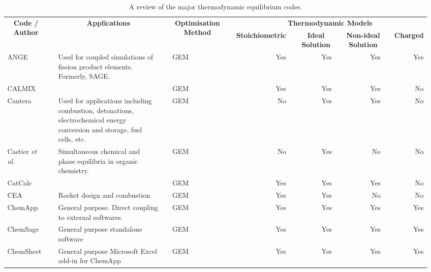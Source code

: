 \begin{landscape}
\pagestyle{empty}
	\begin{longtable}{@{}p{}cp{}clcrcrcrcr@{}}
		\caption{A review of the major thermodynamic equilibrium codes.}\\
		\ra{1.3}\\
		\toprule
		\multicolumn{1}{c}{\multirow{2}{*}{\textbf{Code / Author}}} &\phantom{} & \multicolumn{1}{c}{\multirow{2}{*}{\textbf{Applications}}} & \phantom{} & \multicolumn{1}{c}{\multirow{2}{*}{\textbf{Optimisation Method}}} &\phantom{} & \multicolumn{7}{c}{\textbf{Thermodynamic Models}} \\
		\cmidrule{7-13}
		\multicolumn{1}{c}{} & \phantom{} & \multicolumn{1}{c}{} & \phantom{} & \multicolumn{1}{c}{} & \phantom{} & \multicolumn{1}{c}{\textbf{Stoichiometric}} & \phantom{} & \multicolumn{1}{c}{\textbf{Ideal Solution}} & \phantom{} & \multicolumn{1}{c}{\textbf{Non-ideal Solution}} & \phantom{} & \multicolumn{1}{c}{\textbf{Charged}} \\
		\midrule
		\endhead
		ANGE \cite{Baurens:2014aa} && {Used for coupled simulations of fission product elements. Formerly, SAGE.} && GEM && Yes && Yes && Yes && Yes \\
		CALMIX \cite{GREINER1988529} && {} && GEM && Yes && Yes && Yes && No \\
		Cantera \cite{Goodwin:aa} && {Used for applications including combustion, detonations, electrochemical energy conversion and storage, fuel cells, etc.} && GEM && No && Yes && Yes && No \\
		Castier \textit{et al.} \cite{CASTIER1989237} && {Simultaneous chemical and phase equilibria in organic chemistry.} && GEM && No && Yes && No && No \\
		CatCalc \cite{Shobu09} && {} && GEM && Yes && Yes && Yes && No \\
		CEA \cite{Gordon94} && {Rocket design and combustion} && GEM && Yes && Yes && No && No \\
		ChemApp \cite{Eriksson:2008aa} && {General purpose. Direct coupling to external softwares.} && GEM && Yes && Yes && Yes && Yes\\
		ChemSage \cite{Eriksson90} && {General purpose standalone software} && GEM && Yes && Yes && Yes && Yes\\
		ChemSheet \cite{Koukkari:2005aa} && {General purpose Microsoft Excel add-in for ChemApp} && GEM && Yes && Yes && Yes && Yes\\

\end{longtable}
\end{landscape}
